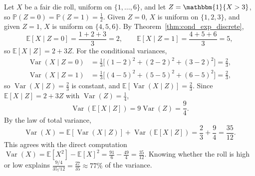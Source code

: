 	\begin{example}
		\label{ex:total-variance-die}
		Let $X$ be a fair die roll, uniform on $\{1, \dots, 6\}$, and let $Z = \mathbbm{1}\{X > 3\}$, so $\mathbb{P}(Z = 0) = \mathbb{P}(Z = 1) = \frac{1}{2}$. Given $Z = 0$, $X$ is uniform on $\{1, 2, 3\}$, and given $Z = 1$, $X$ is uniform on $\{4, 5, 6\}$. By Theorem~\ref{thm:cond_exp_discrete},
		\begin{equation}
			\mathbb{E}[X \mid Z = 0] = \frac{1 + 2 + 3}{3} = 2,
			\qquad
			\mathbb{E}[X \mid Z = 1] = \frac{4 + 5 + 6}{3} = 5,
		\end{equation}
		so $\mathbb{E}[X \mid Z] = 2 + 3Z$. For the conditional variances,
		\begin{align}
			\operatorname{Var}(X \mid Z = 0)
			&= \tfrac{1}{3}\big[(1 - 2)^2 + (2 - 2)^2 + (3 - 2)^2\big] = \tfrac{2}{3}, \\
			\operatorname{Var}(X \mid Z = 1)
			&= \tfrac{1}{3}\big[(4 - 5)^2 + (5 - 5)^2 + (6 - 5)^2\big] = \tfrac{2}{3},
		\end{align}
		so $\operatorname{Var}(X \mid Z) = \frac{2}{3}$ is constant, and
		$\mathbb{E}[\operatorname{Var}(X \mid Z)] = \frac{2}{3}$. Since
		$\mathbb{E}[X \mid Z] = 2 + 3Z$ with $\operatorname{Var}(Z) = \frac{1}{4}$,
		\begin{equation}
			\operatorname{Var}(\mathbb{E}[X \mid Z]) = 9 \operatorname{Var}(Z) = \frac{9}{4}.
		\end{equation}
		By the law of total variance,
		\begin{equation}
			\operatorname{Var}(X)
			= \mathbb{E}[\operatorname{Var}(X \mid Z)] + \operatorname{Var}(\mathbb{E}[X \mid Z])
			= \frac{2}{3} + \frac{9}{4} = \frac{35}{12}.
		\end{equation}
		This agrees with the direct computation
		$\operatorname{Var}(X) = \mathbb{E}[X^2] - \mathbb{E}[X]^2
		= \frac{91}{6} - \frac{49}{4} = \frac{35}{12}$. Knowing whether the roll is high or
		low explains $\frac{9/4}{35/12} = \frac{27}{35} \approx 77\%$ of the variance.
	\end{example}

